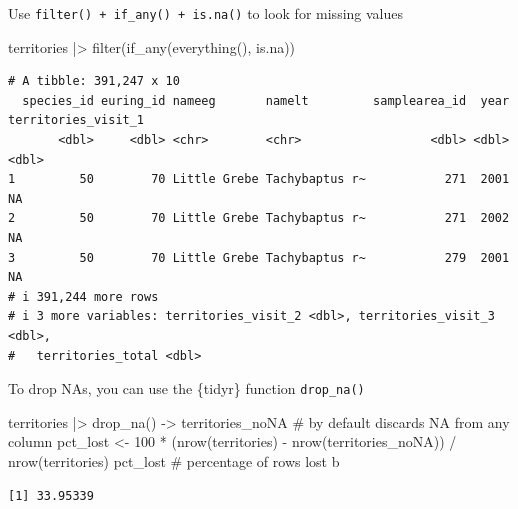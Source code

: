 \documentclass[
  ignorenonframetext,
  aspectratio=169,
]{beamer}
\newenvironment{Shaded}{\begin{snugshade}}{\end{snugshade}}
\newcommand{\CommentTok}[1]{\textcolor[rgb]{0.37,0.37,0.37}{#1}}
\newcommand{\DecValTok}[1]{\textcolor[rgb]{0.68,0.00,0.00}{#1}}
\newcommand{\FunctionTok}[1]{\textcolor[rgb]{0.28,0.35,0.67}{#1}}
\newcommand{\NormalTok}[1]{\textcolor[rgb]{0.00,0.23,0.31}{#1}}
\newcommand{\OtherTok}[1]{\textcolor[rgb]{0.00,0.23,0.31}{#1}}
\newcommand{\SpecialCharTok}[1]{\textcolor[rgb]{0.37,0.37,0.37}{#1}}
\let\oldtexttt\texttt
\renewcommand{\texttt}[1]{\colorbox{gray!20}{\oldtexttt{#1}}}
\begin{document}
\begin{frame}[fragile]{Use \texttt{filter()\ +\ if\_any()\ +\ is.na()}
to look for missing values}
\protect{}\label{use-filter-if_any-is.na-to-look-for-missing-values}
\footnotesize

\begin{Shaded}
\begin{Highlighting}[]
\NormalTok{territories }\SpecialCharTok{|\textgreater{}} \FunctionTok{filter}\NormalTok{(}\FunctionTok{if\_any}\NormalTok{(}\FunctionTok{everything}\NormalTok{(), is.na))}
\end{Highlighting}
\end{Shaded}

\begin{verbatim}
# A tibble: 391,247 x 10
  species_id euring_id nameeg       namelt         samplearea_id  year territories_visit_1
       <dbl>     <dbl> <chr>        <chr>                  <dbl> <dbl>               <dbl>
1         50        70 Little Grebe Tachybaptus r~           271  2001                  NA
2         50        70 Little Grebe Tachybaptus r~           271  2002                  NA
3         50        70 Little Grebe Tachybaptus r~           279  2001                  NA
# i 391,244 more rows
# i 3 more variables: territories_visit_2 <dbl>, territories_visit_3 <dbl>,
#   territories_total <dbl>
\end{verbatim}

\normalsize

\pause

To drop NAs, you can use the \{tidyr\} function \texttt{drop\_na()}

\footnotesize

\begin{Shaded}
\begin{Highlighting}[]
\NormalTok{territories }\SpecialCharTok{|\textgreater{}} \FunctionTok{drop\_na}\NormalTok{() }\OtherTok{{-}\textgreater{}}\NormalTok{ territories\_noNA }\CommentTok{\# by default discards NA from any column}
\NormalTok{pct\_lost }\OtherTok{\textless{}{-}} \DecValTok{100} \SpecialCharTok{*}\NormalTok{ (}\FunctionTok{nrow}\NormalTok{(territories) }\SpecialCharTok{{-}} \FunctionTok{nrow}\NormalTok{(territories\_noNA)) }\SpecialCharTok{/} \FunctionTok{nrow}\NormalTok{(territories)}
\NormalTok{pct\_lost }\CommentTok{\# percentage of rows lost b}
\end{Highlighting}
\end{Shaded}

\begin{verbatim}
[1] 33.95339
\end{verbatim}

\normalsize
\end{frame}
\end{document}
